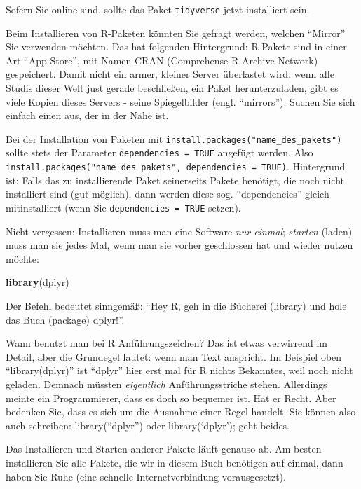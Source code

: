 \documentclass[12pt,ngerman,]{book}
\makeatletter
\newenvironment{Shaded}{\begin{snugshade}}{\end{snugshade}}
\newcommand{\KeywordTok}[1]{\textcolor[rgb]{0.13,0.29,0.53}{\textbf{{#1}}}}
\newcommand{\NormalTok}[1]{{#1}}
\newenvironment{kframe}{%
\medskip{}
\setlength{\fboxsep}{.8em}
 \def\at@end@of@kframe{}%
 \ifinner\ifhmode%
  \def\at@end@of@kframe{\end{minipage}}%
  \begin{minipage}{\columnwidth}%
 \fi\fi%
 \def\FrameCommand##1{\hskip\@totalleftmargin \hskip-\fboxsep
 \colorbox{shadecolor}{##1}\hskip-\fboxsep
     \hskip-\linewidth \hskip-\@totalleftmargin \hskip\columnwidth}%
 \MakeFramed {\advance\hsize-\width
   \@totalleftmargin\z@ \linewidth\hsize
   \@setminipage}}%
 {\par\unskip\endMakeFramed%
 \at@end@of@kframe}
\renewenvironment{Shaded}{\begin{kframe}}{\end{kframe}}
\theoremstyle{definition}
\theoremstyle{definition}
\theoremstyle{remark}
\let\BeginKnitrBlock\begin \let\EndKnitrBlock\end
\makeatother
\begin{document}
Sofern Sie online sind, sollte das Paket \texttt{tidyverse} jetzt
installiert sein.

\BeginKnitrBlock{rmdcaution}
Beim Installieren von R-Paketen könnten Sie gefragt werden, welchen
``Mirror'' Sie verwenden möchten. Das hat folgenden Hintergrund:
R-Pakete sind in einer Art ``App-Store'', mit Namen CRAN (Comprehense R
Archive Network) gespeichert. Damit nicht ein armer, kleiner Server
überlastet wird, wenn alle Studis dieser Welt just gerade beschließen,
ein Paket herunterzuladen, gibt es viele Kopien dieses Servers - seine
Spiegelbilder (engl. ``mirrors''). Suchen Sie sich einfach einen aus,
der in der Nähe ist.
\EndKnitrBlock{rmdcaution}

Bei der Installation von Paketen mit
\texttt{install.packages("name\_des\_pakets")} sollte stets der
Parameter \texttt{dependencies\ =\ TRUE} angefügt werden. Also
\texttt{install.packages("name\_des\_pakets",\ dependencies\ =\ TRUE)}.
Hintergrund ist: Falls das zu installierende Paket seinerseits Pakete
benötigt, die noch nicht installiert sind (gut möglich), dann werden
diese sog. ``dependencies'' gleich mitinstalliert (wenn Sie
\texttt{dependencies\ =\ TRUE} setzen).

Nicht vergessen: Installieren muss man eine Software \emph{nur einmal};
\emph{starten} (laden) muss man sie jedes Mal, wenn man sie vorher
geschlossen hat und wieder nutzen möchte:

\begin{Shaded}
\begin{Highlighting}[]
\KeywordTok{library}\NormalTok{(dplyr) }
\end{Highlighting}
\end{Shaded}

Der Befehl bedeutet sinngemäß: ``Hey R, geh in die Bücherei (library)
und hole das Buch (package) dplyr!''.

\BeginKnitrBlock{rmdcaution}
Wann benutzt man bei R Anführungszeichen? Das ist etwas verwirrend im
Detail, aber die Grundegel lautet: wenn man Text anspricht. Im Beispiel
oben ``library(dplyr)'' ist ``dplyr'' hier erst mal für R nichts
Bekanntes, weil noch nicht geladen. Demnach müssten \emph{eigentlich}
Anführungsstriche stehen. Allerdings meinte ein Programmierer, dass es
doch so bequemer ist. Hat er Recht. Aber bedenken Sie, dass es sich um
die Ausnahme einer Regel handelt. Sie können also auch schreiben:
library(``dplyr'') oder library(`dplyr'); geht beides.
\EndKnitrBlock{rmdcaution}

Das Installieren und Starten anderer Pakete läuft genauso ab. Am besten
installieren Sie alle Pakete, die wir in diesem Buch benötigen auf
einmal, dann haben Sie Ruhe (eine schnelle Internetverbindung
vorausgesetzt).
\end{document}
